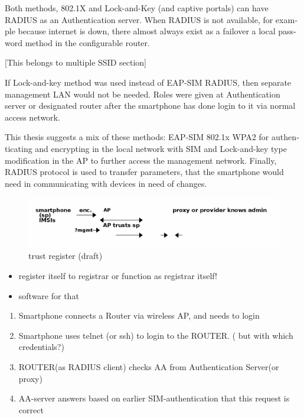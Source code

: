 \documentclass[12pt,a4paper,english]{tutthesis}
\begin{document}
\begin{otherlanguage}{english}
Both methods, 802.1X and Lock-and-Key (and captive portals) can have RADIUS as an Authentication server. 
When RADIUS is not available, for example because internet is down,
there almost always exist as a failover a local password method in the configurable 
router.




[This belongs to multiple SSID section]

If Lock-and-key method was used instead of EAP-SIM RADIUS, then
separate manage\-ment LAN would not be needed. Roles were given at
Authentication server or designated router after the smartphone has done login to it
via normal access network.



This thesis suggests a mix of these methods: EAP-SIM 802.1x WPA2 for
authenticating and encrypting in the local network with SIM and
Lock-and-key type modification in the AP to further access the 
management network. Finally, RADIUS protocol is used to transfer 
parameters, that the smartphone would need in communicating with 
devices in need of changes.

\begin{figure}[htb]
\centering
\includegraphics[width=.9\linewidth]{trust-register.png}
\caption{\label{fig:trust-register}trust register (draft)}
\end{figure}

\begin{itemize}
\item register itself to registrar or function as registrar itself!
\item software for that
\end{itemize}




\begin{enumerate}
\item Smartphone connects a Router via wireless AP, and needs to login
\item Smartphone uses telnet (or ssh) to login to the ROUTER.
( but with which credentials?)
\item ROUTER(as RADIUS client) checks AA from Authentication Server(or 
proxy)
\item AA-server answers based on earlier SIM-authentication that this
request is correct
\end{enumerate}

\end{otherlanguage}
\end{document}
